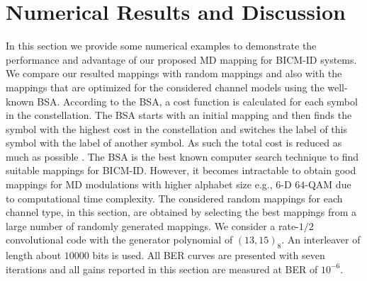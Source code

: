 \documentclass[12pt, draftclsnofoot, onecolumn]{IEEEtran}
\begin{document}
\section{Numerical Results and Discussion}
\label{num_result}
In this section we provide some numerical examples   to demonstrate the performance and advantage of our proposed MD mapping for  BICM-ID systems. We compare our resulted  mappings with   random mappings and also with \color{black} the mappings that are optimized for the considered channel models  using the well-known BSA. According to the   BSA, a cost function is calculated
for each symbol in the constellation. The BSA starts with an initial mapping and  then finds  the
 symbol with the highest cost in the constellation and switches the label of this symbol with the label of another symbol.  As such   the total cost is reduced as much as possible \cite{BSA}. The BSA is  the best known computer search technique to find suitable
mappings for BICM-ID. However, it becomes intractable to obtain good mappings for MD modulations  with higher alphabet size e.g.,  $6$-D $64$-QAM due to computational time complexity.    The considered random mappings for each channel type,  in this section, are obtained by selecting the best mappings from  a large number of randomly generated mappings. \color{black} %
We consider a rate-$1/2$ convolutional code with the generator polynomial of $(13, 15)_{8}$.  An interleaver of length about $10000$ bits is used. %
  All BER curves are presented with seven iterations and \color{black}all  gains reported  in this section are  measured at BER  of $10^{-6}$. 
\end{document}

